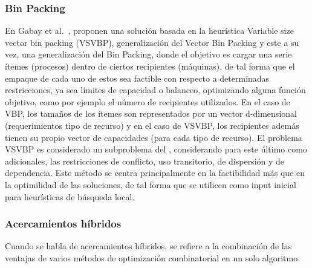 \documentclass[../informe2.tex]{subfiles}
\begin{document}
\subsubsection{Bin Packing}
En Gabay et al.~\cite{gabay2013variable}, proponen una solución basada en la heurística Variable size vector bin packing (VSVBP), generalización del Vector Bin Packing y este a su vez, una generalización del Bin Packing, donde el objetivo es cargar una serie ítemes (procesos) dentro de ciertos recipientes (máquinas), de tal forma que el empaque de cada uno de estos sea factible con respecto a determinadas restricciones, ya sea límites de capacidad o balanceo, optimizando alguna función objetivo, como por ejemplo el número de recipientes utilizados. En el caso de VBP, los tamaños de los ítemes son representados por un vector d-dimensional (requerimientos tipo de recurso) y en el caso de VSVBP, los recipientes además tienen su propio vector de capacidades (para cada tipo de recurso). El problema VSVBP es considerado un subproblema del \mrp, considerando para este último como adicionales, las restricciones de conflicto, uso transitorio, de dispersión y de dependencia. Este método se centra principalmente en la factibilidad más que en la optimilidad de las soluciones, de tal forma que se utilicen como input inicial para heurísticas de búsqueda local. \\


\subsubsection{Acercamientos híbridos}
Cuando se habla de acercamientos híbridos, se refiere a la combinación de las ventajas de varios métodos de optimización combinatorial en un solo algoritmo.\\
\end{document}
